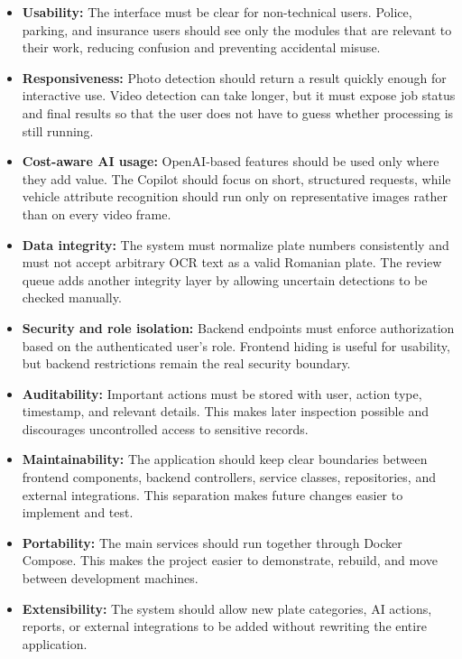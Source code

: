 ﻿\documentclass[12pt,a4paper]{article}
\begin{document}
\begin{itemize}
  \item \textbf{Usability:} The interface must be clear for non-technical users. Police, parking, and insurance users should see only the modules that are relevant to their work, reducing confusion and preventing accidental misuse.

  \item \textbf{Responsiveness:} Photo detection should return a result quickly enough for interactive use. Video detection can take longer, but it must expose job status and final results so that the user does not have to guess whether processing is still running.

  \item \textbf{Cost-aware AI usage:} OpenAI-based features should be used only where they add value. The Copilot should focus on short, structured requests, while vehicle attribute recognition should run only on representative images rather than on every video frame.

  \item \textbf{Data integrity:} The system must normalize plate numbers consistently and must not accept arbitrary OCR text as a valid Romanian plate. The review queue adds another integrity layer by allowing uncertain detections to be checked manually.

  \item \textbf{Security and role isolation:} Backend endpoints must enforce authorization based on the authenticated user's role. Frontend hiding is useful for usability, but backend restrictions remain the real security boundary.

  \item \textbf{Auditability:} Important actions must be stored with user, action type, timestamp, and relevant details. This makes later inspection possible and discourages uncontrolled access to sensitive records.

  \item \textbf{Maintainability:} The application should keep clear boundaries between frontend components, backend controllers, service classes, repositories, and external integrations. This separation makes future changes easier to implement and test.

  \item \textbf{Portability:} The main services should run together through Docker Compose. This makes the project easier to demonstrate, rebuild, and move between development machines.

  \item \textbf{Extensibility:} The system should allow new plate categories, AI actions, reports, or external integrations to be added without rewriting the entire application.
\end{itemize}
\end{document}
